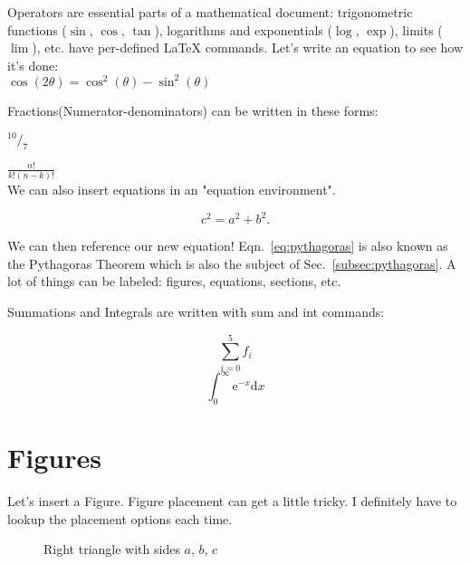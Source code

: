 \documentclass[12pt]{article}
\begin{document}
Operators are essential parts of a mathematical document: 
trigonometric functions ($\sin$, $\cos$, $\tan$), 
logarithms and exponentials ($\log$, $\exp$), 
limits ($\lim$), etc. 
have per-defined LaTeX commands. 
Let's write an equation to see how it's done: \\

$\cos(2\theta) = \cos^{2}(\theta) - \sin^{2}(\theta)$

Fractions(Numerator-denominators) can be written in these forms:

$^{10}/_{7}$ 

$\frac{n!}{k!(n - k)!}$ \\

We can also insert equations in an "equation environment". 

\begin{equation} %
    c^2 = a^2 + b^2.
    \label{eq:pythagoras} %
\end{equation} %

We can then reference our new equation! 
Eqn.~\ref{eq:pythagoras} is also known as the Pythagoras Theorem which is also
the subject of Sec.~\ref{subsec:pythagoras}. A lot of things can be labeled: 
figures, equations, sections, etc.

Summations and Integrals are written with sum and int commands:

\begin{equation} 
  \sum_{i=0}^{5} f_{i}
\end{equation} 
\begin{equation} 
  \int_{0}^{\infty} \mathrm{e}^{-x} \mathrm{d}x
\end{equation} 

\section{Figures}

Let's insert a Figure. Figure placement can get a little tricky. 
I definitely have to lookup the placement options each time.

\begin{figure}[H] %
    \centering %
    \caption{Right triangle with sides $a$, $b$, $c$}
    \label{fig:right-triangle}
\end{figure}
\end{document}

